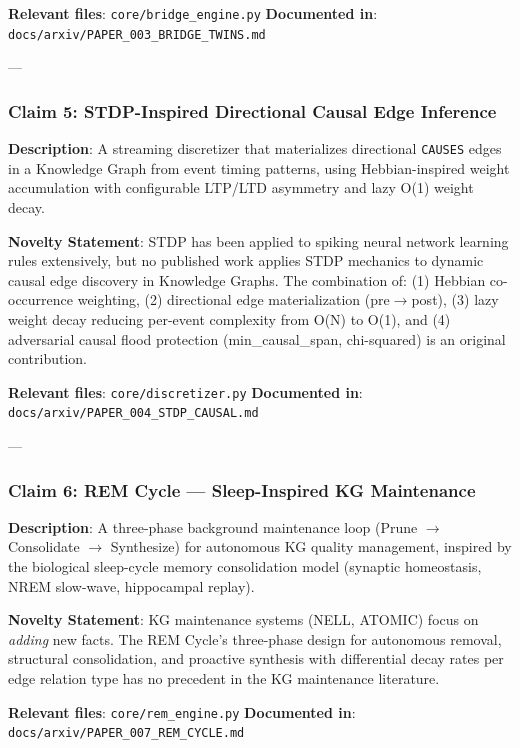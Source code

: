 \documentclass[10pt,journal,compsoc]{IEEEtran}
\begin{document}
\textbf{Relevant files}: \texttt{core/bridge\_engine.py}
\textbf{Documented in}: \texttt{docs/arxiv/PAPER\_003\_BRIDGE\_TWINS.md}

---

\subsubsection{Claim 5: STDP-Inspired Directional Causal Edge Inference}

\textbf{Description}: A streaming discretizer that mater\-ializes directional \texttt{CAUSES} edges in a Knowledge Graph from event timing patterns, using Hebbian-inspired weight accum\-ulation with confi\-gurable LTP/LTD asymmetry and lazy O(1) weight decay.

\textbf{Novelty Statement}: STDP has been applied to spiking neural network learning rules extensively, but no published work applies STDP mechanics to dynamic causal edge discovery in Knowledge Graphs. The combination of: (1) Hebbian co-occurrence weighting, (2) directional edge mater\-ialization (pre$\to$post), (3) lazy weight decay reducing per-event complexity from O(N) to O(1), and (4) adversarial causal flood protection (min\_causal\_span, chi-squared) is an original contr\-ibution.

\textbf{Relevant files}: \texttt{core/discretizer.py}
\textbf{Documented in}: \texttt{docs/arxiv/PAPER\_004\_STDP\_CAUSAL.md}

---

\subsubsection{Claim 6: REM Cycle — Sleep-Inspired KG Maintenance}

\textbf{Description}: A three-phase background maintenance loop (Prune $\to$ Consolidate $\to$ Synthesize) for autonomous KG quality management, inspired by the biological sleep-cycle memory conso\-lidation model (synaptic homeostasis, NREM slow-wave, hippocampal replay).

\textbf{Novelty Statement}: KG maintenance systems (NELL, ATOMIC) focus on \textit{adding} new facts. The REM Cycle's three-phase design for autonomous removal, structural conso\-lidation, and proactive synthesis with diffe\-rential decay rates per edge relation type has no precedent in the KG maintenance literature.

\textbf{Relevant files}: \texttt{core/rem\_engine.py}
\textbf{Documented in}: \texttt{docs/arxiv/PAPER\_007\_REM\_CYCLE.md}
\end{document}
